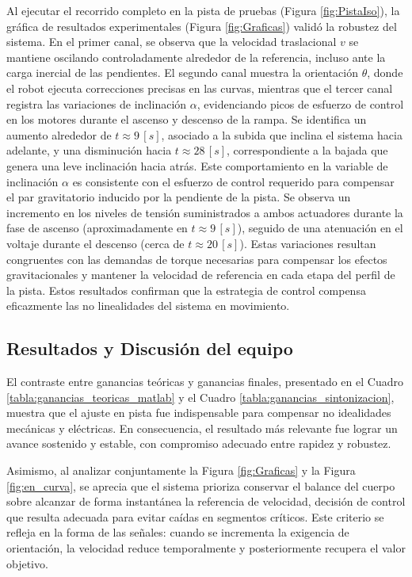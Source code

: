 \documentclass{article}
\begin{document}
Al ejecutar el recorrido completo en la pista de pruebas (Figura \ref{fig:PistaIso}), la gráfica de resultados experimentales (Figura \ref{fig:Graficas}) validó la robustez del sistema. 
En el primer canal, se observa que la velocidad traslacional $v$ se mantiene oscilando controladamente alrededor de la referencia, incluso ante la carga inercial de las pendientes. 
El segundo canal muestra la orientación $\theta$, donde el robot ejecuta correcciones precisas en las curvas, mientras que el tercer canal registra las variaciones de 
inclinación $\alpha$, evidenciando picos de esfuerzo de control en los motores durante el ascenso y descenso de la rampa. Se identifica un aumento alrededor de $t \approx 9\,[s]$, asociado a la subida que inclina el 
sistema hacia adelante, y una disminución hacia $t \approx 28\,[s]$, correspondiente a la bajada que genera una leve inclinación hacia atrás. Este comportamiento en la variable de inclinación $\alpha$ es consistente con el esfuerzo 
de control requerido para compensar el par gravitatorio inducido por la pendiente de la pista. Se observa un incremento en los niveles de tensión suministrados a ambos actuadores durante la fase de ascenso (aproximadamente en $t \approx 9\,[s]$), 
seguido de una atenuación en el voltaje durante el descenso (cerca de $t \approx 20\,[s]$). Estas variaciones resultan congruentes con las demandas de torque necesarias para compensar los efectos gravitacionales y mantener la velocidad de referencia 
en cada etapa del perfil de la pista. Estos resultados confirman que la estrategia de control compensa eficazmente las no linealidades del sistema en movimiento.

\subsection{Resultados y Discusión del equipo}

El contraste entre ganancias teóricas y ganancias finales, presentado en el Cuadro \ref{tabla:ganancias_teoricas_matlab} y el Cuadro \ref{tabla:ganancias_sintonizacion}, muestra que el ajuste en pista fue indispensable para compensar no idealidades mecánicas y eléctricas. En consecuencia, el resultado más relevante fue lograr un avance sostenido y estable, con compromiso adecuado entre rapidez y robustez.

Asimismo, al analizar conjuntamente la Figura \ref{fig:Graficas} y la Figura \ref{fig:en_curva}, se aprecia que el sistema prioriza conservar el balance del cuerpo sobre alcanzar de forma instantánea la referencia de velocidad, decisión de control que resulta adecuada para evitar caídas en segmentos críticos. Este criterio se refleja en la forma de las señales: cuando se incrementa la exigencia de orientación, la velocidad reduce temporalmente y posteriormente recupera el valor objetivo.
\end{document}
